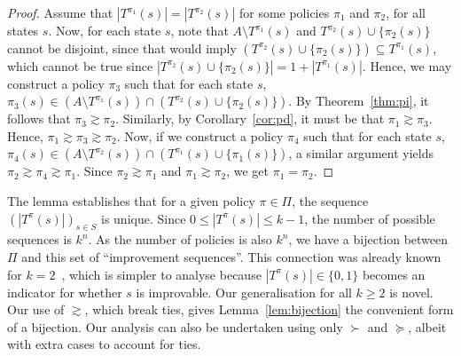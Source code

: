\begin{proof}
    Assume that $|T^{\pi_1}(s)|=|T^{\pi_2}(s)|$ for some policies $\pi_1$ and $\pi_2$, for all states $s$. Now, for each state $s$, note that $A \setminus T^{\pi_{1}}(s)$ and $T^{\pi_{2}}(s) \cup \{\pi_{2}(s)\}$ cannot be disjoint, since that would imply $(T^{\pi_{2}}(s) \cup \{\pi_{2}(s)\}) \subseteq T^{\pi_{1}}(s)$, which cannot be true since $|T^{\pi_{2}}(s) \cup \{\pi_{2}(s)\}| = 1 +  |T^{\pi_{1}}(s)|$. Hence, we may construct a policy $\pi_{3}$ such that for each state $s$, $\pi_{3}(s) \in  (A \setminus T^{\pi_{1}}(s))\cap (T^{\pi_{2}}(s) \cup \{\pi_{2}(s)\})$. By Theorem~\ref{thm:pi}, it follows that $\pi_3 \gtrsim \pi_2$. Similarly, by Corollary~\ref{cor:pd}, it must be that $\pi_{1} \gtrsim \pi_{3}$. Hence, $\pi_{1} \gtrsim \pi_{3} \gtrsim \pi_{2}$. Now, if we construct a policy $\pi_{4}$ such that for each state $s$, $\pi_{4}(s) \in  (A \setminus T^{\pi_{2}}(s))\cap (T^{\pi_{1}}(s) \cup \{\pi_{1}(s)\})$, a similar argument yields $\pi_{2} \gtrsim \pi_{4} \gtrsim \pi_{1}$. Since $\pi_{2} \gtrsim \pi_{1}$ and $\pi_{1} \gtrsim \pi_{2}$, we get $\pi_{1} = \pi_{2}$.
\end{proof}


The lemma establishes that for a given policy $\pi \in \Pi$, the sequence $(|T^{\pi}(s)|)_{s \in S}$ is unique. Since $0 \leq |T^{\pi}(s)| \leq k - 1$, the number of possible sequences is $k^{n}$. As the number of policies is also $k^{n}$, we have a bijection between $\Pi$ and this set of ``improvement sequences''. This connection was already known for $k = 2$~\cite{Mansour+Singh:1999,Szabo+Welzl:2001}, which is simpler to analyse because $|T^{\pi}(s)| \in \{0, 1\}$ becomes an indicator for whether $s$ is improvable. Our generalisation for all $k \geq 2$ is novel. Our use of $\gtrsim$, which break ties, gives Lemma~\ref{lem:bijection} the convenient form of a bijection. Our analysis can also be undertaken using only $\succ$ and $\succeq$, albeit with extra cases to account for ties.

